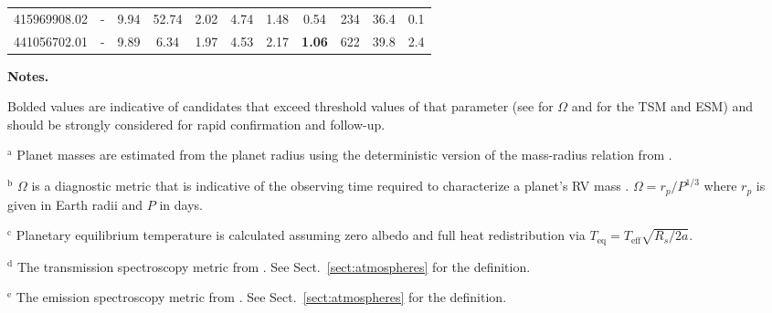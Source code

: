 \begin{landscape}
\begin{table*}
\begin{tabular}{ccccccccccc}
    415969908.02 & - & 9.94 & 52.74 & 2.02 & 4.74 & 1.48 & 0.54 & 234 & 36.4 & 0.1 \\ 
    441056702.01 & - & 9.89 & 6.34 & 1.97 & 4.53 & 2.17 & \textbf{1.06} & 622 & 39.8 & 2.4 \\ 
  \end{tabular}
  \begin{list}{}{}
  \item {\bf{Notes.}}
  \item Bolded values are indicative of candidates that exceed threshold values of that parameter (see \citealt{cloutier18b} for $\Omega$ and \citealt{kempton18} for the TSM and ESM) and should be strongly considered for rapid confirmation and follow-up.
  \item $^{\text{a}}$ Planet masses are estimated from the planet radius using the deterministic version of the mass-radius relation from \cite{chen17}.
  \item $^{\text{b}}$ $\Omega$ is a diagnostic metric that is indicative of the observing time required to characterize a planet's RV mass \citep{cloutier18b}. $\Omega= r_p/P^{1/3}$ where $r_p$ is given in Earth radii and $P$ in days.
    \item $^{\text{c}}$ Planetary equilibrium temperature is calculated assuming zero albedo and full heat redistribution via $T_{\text{eq}} = T_{\text{eff}} \sqrt{R_s/2a}$.
    \item $^{\text{d}}$ The transmission spectroscopy metric from \citep{kempton18}. See Sect.~\ref{sect:atmospheres} for the definition.
    \item $^{\text{e}}$ The emission spectroscopy metric from \citep{kempton18}. See Sect.~\ref{sect:atmospheres} for the definition.
  \end{list}
\end{table*}
\clearpage
\end{landscape}
